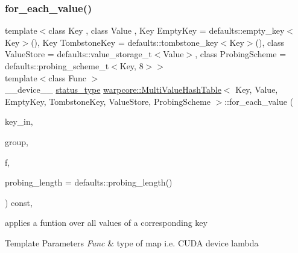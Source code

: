 \subsubsection{\texorpdfstring{for\+\_\+each\+\_\+value()}{for\_each\_value()}}
{\footnotesize\ttfamily template$<$class Key , class Value , Key Empty\+Key = defaults\+::empty\+\_\+key$<$\+Key$>$(), Key Tombstone\+Key = defaults\+::tombstone\+\_\+key$<$\+Key$>$(), class Value\+Store  = defaults\+::value\+\_\+storage\+\_\+t$<$\+Value$>$, class Probing\+Scheme  = defaults\+::probing\+\_\+scheme\+\_\+t$<$\+Key, 8$>$$>$ \\
template$<$class Func $>$ \\
\+\_\+\+\_\+device\+\_\+\+\_\+ \hyperlink{classwarpcore_1_1Status}{status\+\_\+type} \hyperlink{classwarpcore_1_1MultiValueHashTable}{warpcore\+::\+Multi\+Value\+Hash\+Table}$<$ Key, Value, Empty\+Key, Tombstone\+Key, Value\+Store, Probing\+Scheme $>$\+::for\+\_\+each\+\_\+value (\begin{DoxyParamCaption}\item[{key\+\_\+type}]{key\+\_\+in,  }\item[{const cg\+::thread\+\_\+block\+\_\+tile$<$ \hyperlink{classwarpcore_1_1MultiValueHashTable_a2191f42810234e459bc4ef6e491ec929}{cg\+\_\+size}()$>$ \&}]{group,  }\item[{Func}]{f,  }\item[{index\+\_\+type}]{probing\+\_\+length = {\ttfamily defaults\+:\+:probing\+\_\+length()} }\end{DoxyParamCaption}) const\hspace{0.3cm}{\ttfamily [inline]}, {\ttfamily [noexcept]}}



applies a funtion over all values of a corresponding key 


\begin{DoxyTemplParams}{Template Parameters}
{\em Func} & type of map i.\+e. C\+U\+DA device lambda \\
\hline
\end{DoxyTemplParams}

